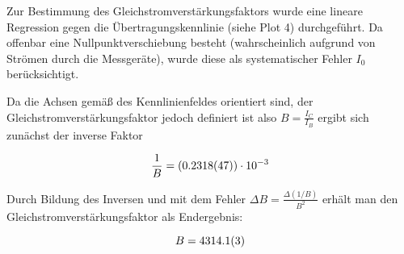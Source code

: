 \documentclass[a4paper,german,12pt,smallheadings]{scrartcl}
\begin{document}

Zur Bestimmung des Gleichstromverstärkungsfaktors wurde eine lineare Regression
gegen die Übertragungskennlinie (siehe Plot 4) durchgeführt. Da offenbar eine
Nullpunktverschiebung besteht (wahrscheinlich aufgrund von Strömen durch die
Messgeräte), wurde diese als systematischer Fehler $I_0$ berücksichtigt.

Da die Achsen gemäß des Kennlinienfeldes orientiert sind, der
Gleichstromverstärkungsfaktor jedoch definiert ist also $B = \frac{I_C}{I_B}$
ergibt sich zunächst der inverse Faktor

\begin{equation}
  \frac{1}{B} = (\num{0.2318+-0.0047}) \cdot 10^{-3}
\end{equation}

Durch Bildung des Inversen und mit dem Fehler $\Delta B =
\frac{\Delta(1/B)}{B^2}$ erhält man den Gleichstromverstärkungsfaktor als
Endergebnis:

\begin{equation}
  B = \num{4314.1+-0.3}
\end{equation}
\end{document}
